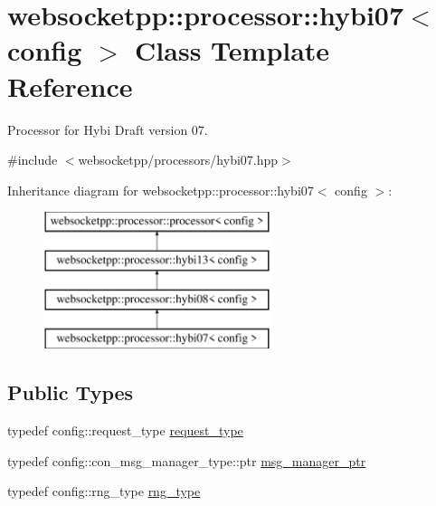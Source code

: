 \hypertarget{classwebsocketpp_1_1processor_1_1hybi07}{}\section{websocketpp\+:\+:processor\+:\+:hybi07$<$ config $>$ Class Template Reference}
\label{classwebsocketpp_1_1processor_1_1hybi07}


Processor for Hybi Draft version 07.  




{\ttfamily \#include $<$websocketpp/processors/hybi07.\+hpp$>$}

Inheritance diagram for websocketpp\+:\+:processor\+:\+:hybi07$<$ config $>$\+:\begin{figure}[H]
\begin{center}
\leavevmode
\includegraphics[height=4.000000cm]{classwebsocketpp_1_1processor_1_1hybi07}
\end{center}
\end{figure}
\subsection*{Public Types}
\begin{DoxyCompactItemize}
\item 
typedef config\+::request\+\_\+type \hyperlink{classwebsocketpp_1_1processor_1_1hybi07_ae8e3aeed4b4d6d67c8af5dccf70d468d}{request\+\_\+type}
\item 
typedef config\+::con\+\_\+msg\+\_\+manager\+\_\+type\+::ptr \hyperlink{classwebsocketpp_1_1processor_1_1hybi07_abfa0723364d644f3320141ade624fc8e}{msg\+\_\+manager\+\_\+ptr}
\item 
typedef config\+::rng\+\_\+type \hyperlink{classwebsocketpp_1_1processor_1_1hybi07_afb0db8323385a430df83372ce5b29bc2}{rng\+\_\+type}
\end{DoxyCompactItemize}
